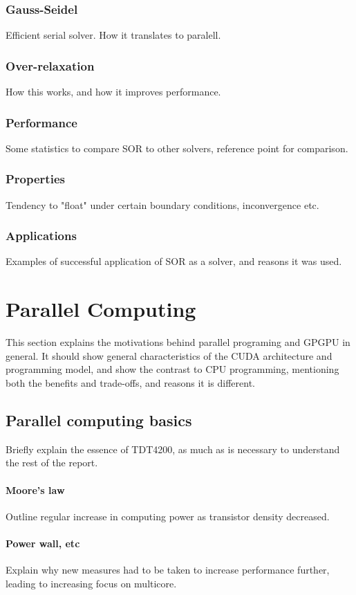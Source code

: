 \subsubsection{Gauss-Seidel}
Efficient serial solver. How it translates to paralell.
\subsubsection{Over-relaxation}
How this works, and how it improves performance.
\subsubsection{Performance}
Some statistics to compare SOR to other solvers, reference point for comparison.
\subsubsection{Properties}
Tendency to "float" under certain boundary conditions, inconvergence etc.
\subsubsection{Applications}
Examples of successful application of SOR as a solver, and reasons it was used.



\section{Parallel Computing}
This section explains the motivations behind parallel programing and GPGPU in
general. It should show general characteristics of the CUDA architecture and
programming model, and show the contrast to CPU programming, mentioning both the
benefits and trade-offs, and reasons it is different.

\subsection{Parallel computing basics}
Briefly explain the essence of TDT4200, as much as is necessary to understand
the rest of the report.
\paragraph{Moore's law}
Outline regular increase in computing power as transistor density decreased.
\paragraph{Power wall, etc}
Explain why new measures had to be taken to increase performance further,
leading to increasing focus on multicore.
